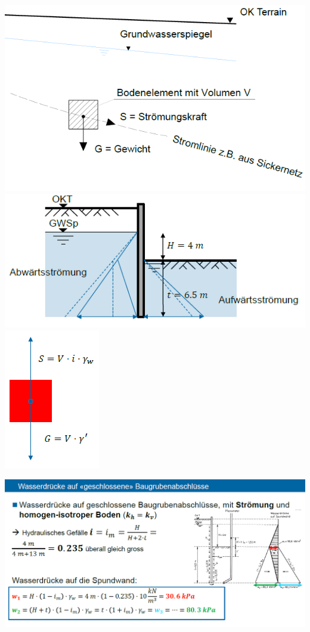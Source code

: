 \begin{minipage}{0.3\linewidth}
	\includegraphics[width=\linewidth]{images/GW18Kraftwirkung.PNG}
	\includegraphics[width=\linewidth]{images/GW19Stroemungsdruck.PNG}
	\includegraphics[width=0.5\linewidth]{images/GW21Kraftwirkung.PNG}
\end{minipage}
	\includegraphics[width=0.8\linewidth]{images/GW20Wasserdrucke.PNG}
